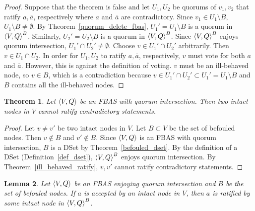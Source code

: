 \documentclass[12pt, psamsfonts]{amsart}
\newtheorem{thm}{Theorem}[subsection]
\newtheorem{lem}[thm]{Lemma}
\theoremstyle{definition}
\theoremstyle{remark}
\numberwithin{equation}{subsection}
\begin{document}
\begin{proof}
    Suppose that the theorem is false and let $U_1, U_2$ be quorums of $v_1, v_2$ that ratify $a, \bar{a}$, respectively where $a$ and $\bar{a}$ are contradictory.
    Since $v_1 \in U_1 \setminus B$,  $U_1 \setminus B \ne \emptyset$.
    By Theorem~\ref{quorum_delete_fbas}, $U_1' = U_1 \setminus B$ is a quorum in $\ev{V, Q}^B$.
    Similarly, $U_2' = U_2 \setminus B$ is a quorum in $\ev{V, Q}^B$.
    Since $\ev{V, Q}^B$ enjoys quorum intersection, $U_1' \cap U_2' \ne \emptyset$.
    Choose $v \in U_1' \cap U_2'$ arbitrarily.
    Then $v \in U_1 \cap U_2$.
    In order for $U_1, U_2$ to ratify $a, \bar{a}$, respectively, $v$ must vote for both $a$ and $\bar{a}$.
    However, this is against the definition of voting.
    $v$ must be an ill-behaved node, so $v \in B$, which is a contradiction because $v \in U_1' \cap U_2' \subset U_1' = U_1 \setminus B$ and $B$ contains all the ill-behaved nodes.
\end{proof}

\begin{thm}\label{intact_ratify_contradictory}
    Let $\ev{V, Q}$ be an FBAS with quorum intersection.
    Then two intact nodes in $V$ cannot ratify contradictory statements.
\end{thm}

\begin{proof}
    Let $v \ne v'$ be two intact nodes in $V$.
    Let $B \subset V$ be the set of befouled nodes.
    Then $v \notin B$ and $v' \notin B$.
    Since $\ev{V, Q}$ is an FBAS with quorum intersection, $B$ is a DSet by Theorem~\ref{befouled_dset}.
    By the definition of a DSet (Definition~\ref{def_dset}), $\ev{V, Q}^B$ enjoys quorum intersection.
    By Theorem~\ref{ill_behaved_ratify}, $v, v'$ cannot ratify contradictory statements.
\end{proof}

\begin{lem}\label{lem_intact_ratify}
    Let $\ev{V, Q}$ be an FBAS enjoying quorum intersection and $B$ be the set of befouled nodes.
    If $a$ is accepted by an intact node in $V$, then $a$ is ratified by some intact node in $\ev{V, Q}^B$.
\end{lem}
\end{document}
